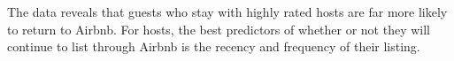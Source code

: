 \documentclass[sigconf]{acmart}
\begin{document}
The data reveals that guests who stay with highly rated hosts are far more likely to return to Airbnb. For hosts, the best predictors of whether or not they will
continue to list through Airbnb is the recency and frequency of their listing.




\end{document}
